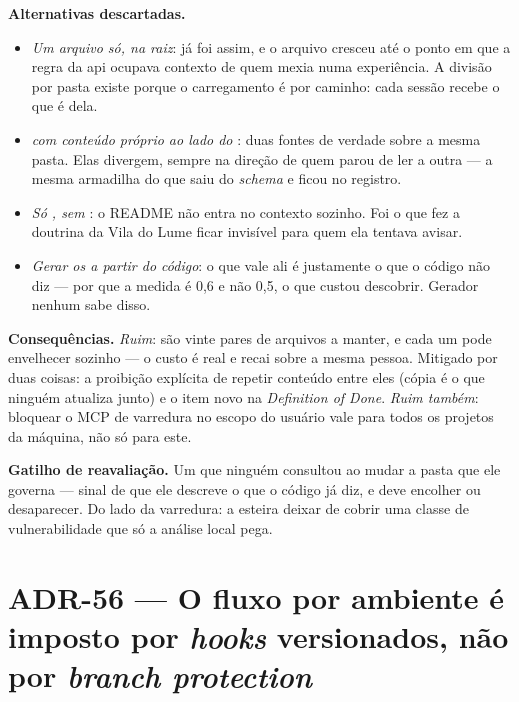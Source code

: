\textbf{Alternativas descartadas.}
\begin{itemize}
  \item \emph{Um arquivo só, na raiz}: já foi assim, e o arquivo cresceu até o
    ponto em que a regra da api ocupava contexto de quem mexia numa experiência.
    A divisão por pasta existe porque o carregamento é por caminho: cada sessão
    recebe o que é dela.
  \item \emph{ com conteúdo próprio ao lado do }:
    duas fontes de verdade sobre a mesma pasta. Elas divergem, sempre na direção
    de quem parou de ler a outra --- a mesma armadilha do  que
    saiu do \emph{schema} e ficou no registro.
  \item \emph{Só , sem }: o README não entra no
    contexto sozinho. Foi o que fez a doutrina da Vila do Lume ficar invisível
    para quem ela tentava avisar.
  \item \emph{Gerar os  a partir do código}: o que vale ali é
    justamente o que o código não diz --- por que a medida é 0{,}6 e não 0{,}5,
    o que custou descobrir. Gerador nenhum sabe disso.
\end{itemize}

\textbf{Consequências.} \emph{Ruim}: são vinte pares de arquivos a manter, e
cada um pode envelhecer sozinho --- o custo é real e recai sobre a mesma pessoa.
Mitigado por duas coisas: a proibição explícita de repetir conteúdo entre eles
(cópia é o que ninguém atualiza junto) e o item novo na \emph{Definition of
Done}. \emph{Ruim também}: bloquear o MCP de varredura no escopo do usuário vale
para todos os projetos da máquina, não só para este.

\textbf{Gatilho de reavaliação.} Um  que ninguém consultou ao
mudar a pasta que ele governa --- sinal de que ele descreve o que o código já
diz, e deve encolher ou desaparecer. Do lado da varredura: a esteira deixar de
cobrir uma classe de vulnerabilidade que só a análise local pega.

\section{ADR-56 --- O fluxo por ambiente é imposto por \emph{hooks} versionados,
não por \emph{branch protection}}
\label{adr:fluxo-por-hooks}

